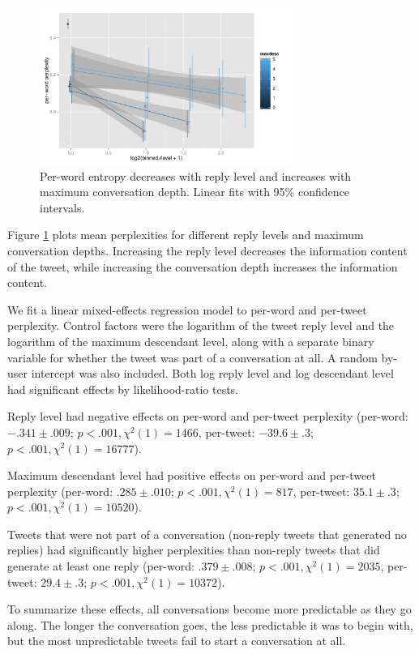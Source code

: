 \documentclass[11pt,letterpaper]{article}
\begin{document}
\begin{figure}
 \centering
  \includegraphics[width=3.25in]{figures/rlevel-and-maxdesc.pdf}
 \caption{Per-word entropy decreases with reply level and increases with maximum conversation depth. Linear fits with 95\% confidence intervals.}\label{fig:rlevel-maxdesc}\vspace*{-.5em}
\end{figure}


Figure \ref{fig:rlevel-maxdesc} plots mean perplexities for different reply levels and maximum conversation depths. Increasing the reply level decreases the information content of the tweet, while increasing the conversation depth increases the information content.

We fit a linear mixed-effects regression model to per-word and per-tweet perplexity.  Control factors were the logarithm of the tweet reply level and the logarithm of the maximum descendant level, along with a separate binary variable for whether the tweet was part of a conversation at all. A random by-user intercept was also included.  Both log reply level and log descendant level had significant effects by likelihood-ratio tests.

Reply level had negative effects on per-word and per-tweet perplexity (per-word: $-.341 \pm .009$; $p < .001, \chi^2(1) = 1466$, per-tweet: $-39.6 \pm .3$; $p < .001, \chi^2(1) =  16777$).

Maximum descendant level had positive effects on per-word and per-tweet perplexity (per-word: $.285 \pm .010$; $p < .001, \chi^2(1) = 817$, per-tweet: $35.1 \pm .3$; $p < .001, \chi^2(1) = 10520$).

Tweets that were not part of a conversation (non-reply tweets that generated no replies) had significantly higher perplexities than non-reply tweets that did generate at least one reply (per-word: $.379 \pm .008$; $p < .001, \chi^2(1) = 2035$, per-tweet: $29.4 \pm .3$; $p < .001, \chi^2(1) = 10372$).  

To summarize these effects, all conversations become more predictable as they go along. The longer the conversation goes, the less predictable it was to begin with, but the most unpredictable tweets fail to start a conversation at all.
\end{document}
